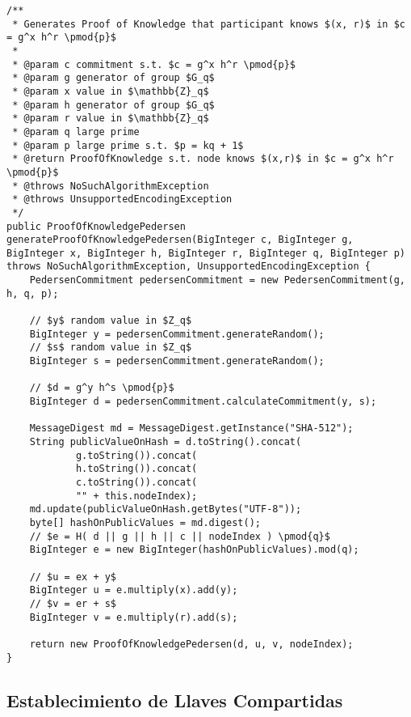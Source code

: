 \begin{verbatim}
/**
 * Generates Proof of Knowledge that participant knows $(x, r)$ in $c = g^x h^r \pmod{p}$
 *
 * @param c commitment s.t. $c = g^x h^r \pmod{p}$
 * @param g generator of group $G_q$
 * @param x value in $\mathbb{Z}_q$
 * @param h generator of group $G_q$
 * @param r value in $\mathbb{Z}_q$
 * @param q large prime
 * @param p large prime s.t. $p = kq + 1$
 * @return ProofOfKnowledge s.t. node knows $(x,r)$ in $c = g^x h^r \pmod{p}$
 * @throws NoSuchAlgorithmException     
 * @throws UnsupportedEncodingException 
 */
public ProofOfKnowledgePedersen generateProofOfKnowledgePedersen(BigInteger c, BigInteger g, BigInteger x, BigInteger h, BigInteger r, BigInteger q, BigInteger p) throws NoSuchAlgorithmException, UnsupportedEncodingException {
    PedersenCommitment pedersenCommitment = new PedersenCommitment(g, h, q, p);

    // $y$ random value in $Z_q$
    BigInteger y = pedersenCommitment.generateRandom();
    // $s$ random value in $Z_q$ 
    BigInteger s = pedersenCommitment.generateRandom(); 

    // $d = g^y h^s \pmod{p}$
    BigInteger d = pedersenCommitment.calculateCommitment(y, s); 

    MessageDigest md = MessageDigest.getInstance("SHA-512");
    String publicValueOnHash = d.toString().concat(
            g.toString()).concat(
            h.toString()).concat(
            c.toString()).concat(
            "" + this.nodeIndex);
    md.update(publicValueOnHash.getBytes("UTF-8"));
    byte[] hashOnPublicValues = md.digest();
    // $e = H( d || g || h || c || nodeIndex ) \pmod{q}$
    BigInteger e = new BigInteger(hashOnPublicValues).mod(q); 

    // $u = ex + y$
    BigInteger u = e.multiply(x).add(y);
    // $v = er + s$ 
    BigInteger v = e.multiply(r).add(s);

    return new ProofOfKnowledgePedersen(d, u, v, nodeIndex);
}
\end{verbatim}

\subsection{Establecimiento de Llaves Compartidas}

